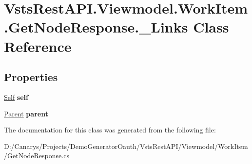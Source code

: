 \hypertarget{class_vsts_rest_a_p_i_1_1_viewmodel_1_1_work_item_1_1_get_node_response_1_1___links}{}\section{Vsts\+Rest\+A\+P\+I.\+Viewmodel.\+Work\+Item.\+Get\+Node\+Response.\+\_\+\+Links Class Reference}
\label{class_vsts_rest_a_p_i_1_1_viewmodel_1_1_work_item_1_1_get_node_response_1_1___links}
\subsection*{Properties}
\begin{DoxyCompactItemize}
\item 
\mbox{\label{class_vsts_rest_a_p_i_1_1_viewmodel_1_1_work_item_1_1_get_node_response_1_1___links_afb22b1d590f7a8a1d70e9af9d6b21be6}} 
\mbox{\hyperlink{class_vsts_rest_a_p_i_1_1_viewmodel_1_1_work_item_1_1_get_node_response_1_1_self}{Self}} {\bfseries self}
\item 
\mbox{\label{class_vsts_rest_a_p_i_1_1_viewmodel_1_1_work_item_1_1_get_node_response_1_1___links_a425b7de55dbfe6684aaf67cccd5ce04f}} 
\mbox{\hyperlink{class_vsts_rest_a_p_i_1_1_viewmodel_1_1_work_item_1_1_get_node_response_1_1_parent}{Parent}} {\bfseries parent}
\end{DoxyCompactItemize}


The documentation for this class was generated from the following file\+:\begin{DoxyCompactItemize}
\item 
D\+:/\+Canarys/\+Projects/\+Demo\+Generator\+Oauth/\+Vsts\+Rest\+A\+P\+I/\+Viewmodel/\+Work\+Item/Get\+Node\+Response.\+cs\end{DoxyCompactItemize}
